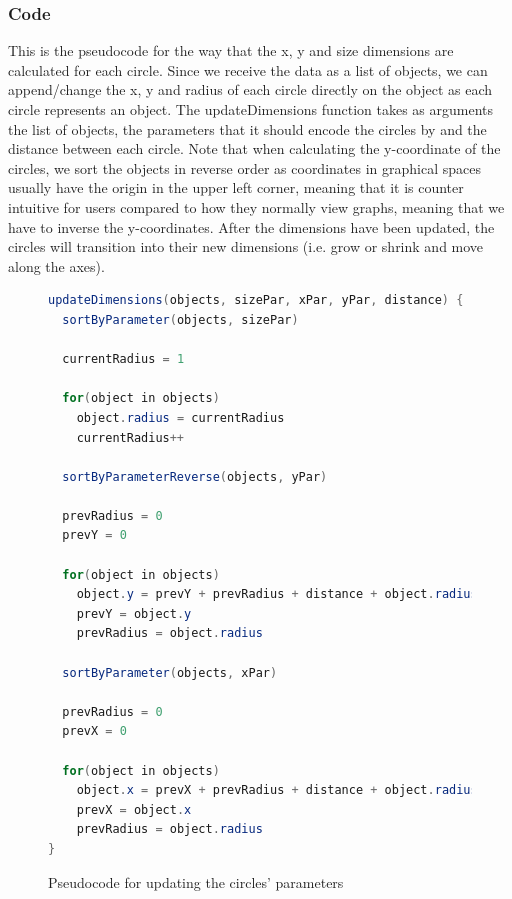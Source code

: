 \documentclass[Report.tex]{subfiles}
\begin{document}
\subsubsection{Code}
This is the pseudocode for the way that the x, y and size dimensions are calculated for each circle.
Since we receive the data as a list of objects, we can append/change the x, y and radius of each circle directly on the object as each circle represents an object. The updateDimensions function takes as arguments the list of objects, the parameters that it should encode the circles by and the distance between each circle. Note that when calculating the y-coordinate of the circles, we sort the objects in reverse order as coordinates in graphical spaces usually have the origin in the upper left corner, meaning that it is counter intuitive for users compared to how they normally view graphs, meaning that we have to inverse the y-coordinates. After the dimensions have been updated, the circles will transition into their new dimensions (i.e. grow or shrink and move along the axes).
\begin{figure}
\begin{lstlisting}[language=java]
updateDimensions(objects, sizePar, xPar, yPar, distance) {
  sortByParameter(objects, sizePar)

  currentRadius = 1

  for(object in objects)
    object.radius = currentRadius
    currentRadius++

  sortByParameterReverse(objects, yPar)

  prevRadius = 0
  prevY = 0

  for(object in objects)
    object.y = prevY + prevRadius + distance + object.radius
    prevY = object.y
    prevRadius = object.radius

  sortByParameter(objects, xPar)

  prevRadius = 0
  prevX = 0

  for(object in objects)
    object.x = prevX + prevRadius + distance + object.radius
    prevX = object.x
    prevRadius = object.radius
}
\end{lstlisting}
\caption{Pseudocode for updating the circles' parameters}
\end{figure}
\end{document}
